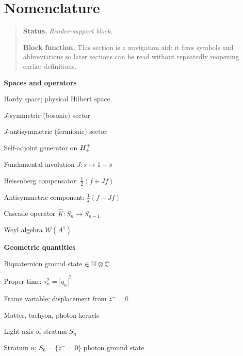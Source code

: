 \section*{Nomenclature}
\begin{quote}\small
\noindent\textbf{Status.} \emph{Reader-support block.}\par
\noindent\textbf{Block function.} This section is a navigation aid: it fixes symbols and abbreviations so later sections can be read without repeatedly reopening earlier definitions.
\end{quote}

\noindent\begin{minipage}[t]{0.48\textwidth}
\small
\noindent\textbf{Spaces and operators}
\begin{description}[leftmargin=1.8em, labelindent=0pt, itemsep=1pt]
 \item[$\Hplus$] Hardy space; physical Hilbert space
 \item[$\Hplusplus$] $J$-symmetric (bosonic) sector
 \item[$\Hplusminus$] $J$-antisymmetric (fermionic) sector
 \item[$L_0$] Self-adjoint generator on $\Hplusplus$
 \item[$J$] Fundamental involution $J:s\mapsto 1-\bar s$
 \item[$C(f)$] Heisenberg compensator: $\tfrac{1}{2}(f+Jf)$
 \item[$A(f)$] Antisymmetric component: $\tfrac{1}{2}(f-Jf)$
 \item[$\KC$] Cascade operator $\hat K:S_n\to S_{n-1}$
 \item[$\WA$] Weyl algebra $\mathcal{W}(A^1)$
\end{description}

\medskip
\noindent\textbf{Geometric quantities}
\begin{description}[leftmargin=1.8em, labelindent=0pt, itemsep=1pt]
 \item[$q_n$] Biquaternion ground state $\in\mathbb{H}\otimes\mathbb{C}$
 \item[$\tau_n$] Proper time: $\tau_n^2=|q_n|^2$
 \item[$\zminus$] Frame variable; displacement from $z^-=0$
 \item[$K_1,K_2,K_3$] Matter, tachyon, photon kernels
 \item[$L_n$] Light axis of stratum $S_n$
 \item[$S_n$] Stratum $n$; $S_0=\{z^-=0\}$ photon ground state
\end{description}


\end{minipage}
